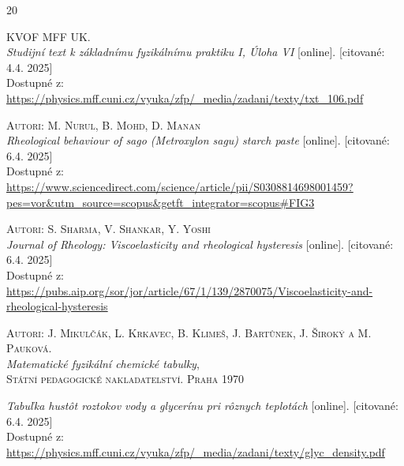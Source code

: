 \documentclass{prepareprotokol} %
\begin{document}
    
\begin{thebibliography}{20}

\textsc{KVOF MFF UK.}\\
\textit{Studijní text k základnímu fyzikálnímu praktiku I, \textit{Úloha} VI } [online]. [citované: 4.4. 2025] \\
Dostupné z: 
\url{https://physics.mff.cuni.cz/vyuka/zfp/_media/zadani/texty/txt_106.pdf}

\textsc{Autori: M. Nurul, B. Mohd, D. Manan}\\
\textit{Rheological behaviour of sago (Metroxylon sagu) starch paste} [online]. [citované: 6.4. 2025] \\
Dostupné z: 
\url{https://www.sciencedirect.com/science/article/pii/S0308814698001459?pes=vor&utm_source=scopus&getft_integrator=scopus#FIG3}

\textsc{Autori: S. Sharma, V. Shankar, Y. Yoshi}\\
\textit{Journal of Rheology: Viscoelasticity and rheological hysteresis} [online]. [citované: 6.4. 2025] \\
Dostupné z:\\ 
\url{https://pubs.aip.org/sor/jor/article/67/1/139/2870075/Viscoelasticity-and-rheological-hysteresis}


\textsc{Autori: J. Mikulčák, L. Krkavec, B. Klimeš, J. Bartůnek, J. Široký a M. Pauková.} \\\textit{Matematické fyzikální chemické tabulky},\\ \textsc{Státní pedagogické nakladatelství.} \textsc{Praha 1970}

\textit{Tabuľka hustôt roztokov vody a glycerínu pri rôznych teplotách} [online]. [citované: 6.4. 2025] \\
Dostupné z: 
\url{https://physics.mff.cuni.cz/vyuka/zfp/_media/zadani/texty/glyc_density.pdf}


          		

	\end{thebibliography}
\end{document}
